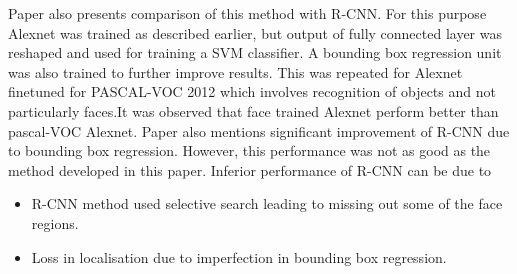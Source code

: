 \documentclass{article}
\begin{document}
\par
Paper also presents comparison of this method with R-CNN. For this purpose Alexnet was trained as described earlier, but output of fully connected layer was reshaped and used for training a SVM classifier. A bounding box regression unit was also trained to further improve results. This was repeated for Alexnet finetuned for PASCAL-VOC 2012 which involves recognition of objects and not particularly faces.It was observed that face trained Alexnet perform better than pascal-VOC Alexnet. Paper also mentions significant improvement of R-CNN due to bounding box regression. However, this performance was not as good as the method developed in this paper. Inferior performance of R-CNN can be due to
\begin{itemize}
\item R-CNN method used selective search leading to missing out some of the face regions.
\item Loss in localisation due to imperfection in bounding box regression.
\end{itemize}
\end{document}
